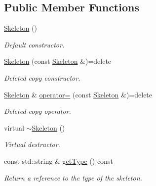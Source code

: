 \subsection*{Public Member Functions}
\begin{DoxyCompactItemize}
\item 
\mbox{\label{classassistive__rehab_1_1Skeleton_af01a02f1ce9ae4c801cd6e66ccf7407f}} 
\mbox{\hyperlink{classassistive__rehab_1_1Skeleton_af01a02f1ce9ae4c801cd6e66ccf7407f}{Skeleton}} ()
\begin{DoxyCompactList}\small\item\em Default constructor. \end{DoxyCompactList}\item 
\mbox{\label{classassistive__rehab_1_1Skeleton_a5bd61b69a0526271e7aa5de41e62200d}} 
\mbox{\hyperlink{classassistive__rehab_1_1Skeleton_a5bd61b69a0526271e7aa5de41e62200d}{Skeleton}} (const \mbox{\hyperlink{classassistive__rehab_1_1Skeleton}{Skeleton}} \&)=delete
\begin{DoxyCompactList}\small\item\em Deleted copy constructor. \end{DoxyCompactList}\item 
\mbox{\label{classassistive__rehab_1_1Skeleton_abedc3e06f870efa7e4b445606a0c1cde}} 
\mbox{\hyperlink{classassistive__rehab_1_1Skeleton}{Skeleton}} \& \mbox{\hyperlink{classassistive__rehab_1_1Skeleton_abedc3e06f870efa7e4b445606a0c1cde}{operator=}} (const \mbox{\hyperlink{classassistive__rehab_1_1Skeleton}{Skeleton}} \&)=delete
\begin{DoxyCompactList}\small\item\em Deleted copy operator. \end{DoxyCompactList}\item 
\mbox{\label{classassistive__rehab_1_1Skeleton_aeece886a4e2f039128144f94f25efd10}} 
virtual \mbox{\hyperlink{classassistive__rehab_1_1Skeleton_aeece886a4e2f039128144f94f25efd10}{$\sim$\+Skeleton}} ()
\begin{DoxyCompactList}\small\item\em Virtual destructor. \end{DoxyCompactList}\item 
const std\+::string \& \mbox{\hyperlink{classassistive__rehab_1_1Skeleton_a4efc4844bd2b185f1080ee52ab69cb04}{get\+Type}} () const
\begin{DoxyCompactList}\small\item\em Return a reference to the type of the skeleton. \end{DoxyCompactList}\item 

\end{DoxyCompactItemize}
